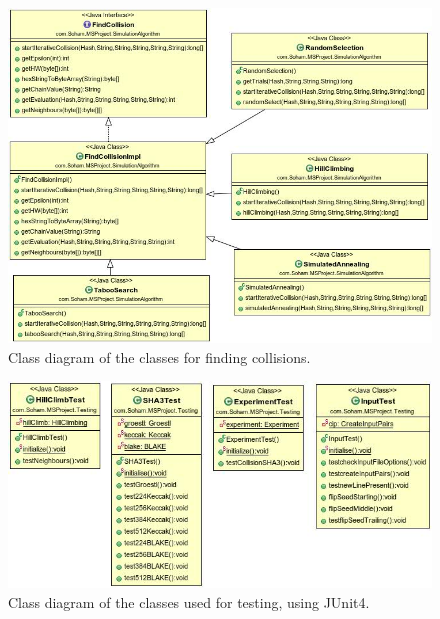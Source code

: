 \begin{figure}
  \begin{center}
    \includegraphics[width=7in]{FindCollisionClasses.jpg}
  \end{center}
  \caption{Class diagram of the classes for finding collisions.}
  \label{fig:UMLCollisionFindingClasses}
\end{figure}

\begin{figure}
  \begin{center}
    \includegraphics[width=6.75in]{testingcode.jpg}
  \end{center}
  \caption{Class diagram of the classes used for testing, using JUnit4.}
  \label{fig:UMLJUnitTestClasses}
\end{figure}
